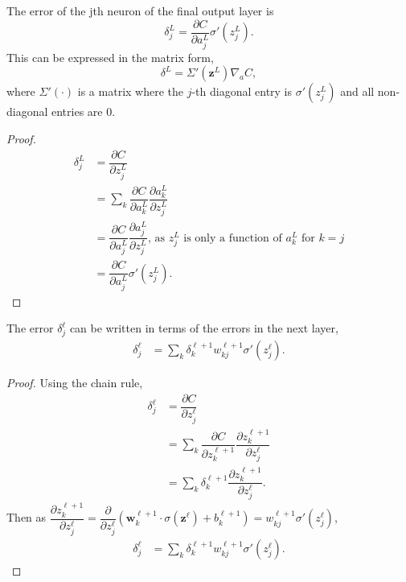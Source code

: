
\begin{proposition}
	The error of the jth neuron of the final output layer is
	\[
		\delta_j^L = \dfrac{\partial C}{\partial a_j^L}\sigma'(z_j^L).
	\]
	This can be expressed in the matrix form,
	\[
		\delta^L = \Sigma'(\mathbf{z}^L)\nabla_aC,
	\]
where $\Sigma'(\cdot)$ is a matrix where the $j$-th diagonal entry is $\sigma'(z_j^L)$ and all non-diagonal entries are 0.
\end{proposition}

\begin{proof}
	\begin{align*}
		\delta_j^L & = \dfrac{\partial C}{\partial z_j^L} \\
		& = \sum_k\dfrac{\partial C}{\partial a_k^L}\dfrac{\partial a_k^L}{\partial z_j^L} \\
		& = \dfrac{\partial C}{\partial a_j^L}\dfrac{\partial a_j^L}{\partial z_j^L}\text{, as }z_j^L\text{ is only a function of }a_k^L\text{ for }k = j \\
		& = \dfrac{\partial C}{\partial a_j^L}\sigma'(z_j^L).
	\end{align*}
\end{proof}

\begin{proposition}
	The error $\delta^\ell_j$ can be written in terms of the errors in the next layer, 
	\begin{align*}
		\delta_j^\ell & = \sum_k\delta_k^{\ell+1}w_{kj}^{\ell+1}\sigma'(z_j^\ell).
	\end{align*}
\end{proposition}

\begin{proof}
	Using the chain rule,
	\begin{align*}
		\delta_j^\ell & = \dfrac{\partial C}{\partial z_j^\ell} \\
		& = \sum_k\dfrac{\partial C}{\partial z_k^{\ell+1}}\dfrac{\partial z_k^{\ell+1}}{\partial z_j^\ell} \\
		& = \sum_k\delta_k^{\ell+1}\dfrac{\partial z_k^{\ell+1}}{\partial z_j^\ell}.
	\end{align*}
	Then as $\dfrac{\partial z_k^{\ell+1}}{\partial z_j^\ell} = \dfrac{\partial}{\partial z_j^\ell}(\mathbf{w}_k^{\ell+1}\cdot\sigma(\mathbf{z}^\ell) + b_k^{\ell+1}) = w_{kj}^{\ell+1}\sigma'(z_j^\ell)$,
	\begin{align*}
		\delta_j^\ell & = \sum_k\delta_k^{\ell+1}w_{kj}^{\ell+1}\sigma'(z_j^\ell).
	\end{align*}
\end{proof}


